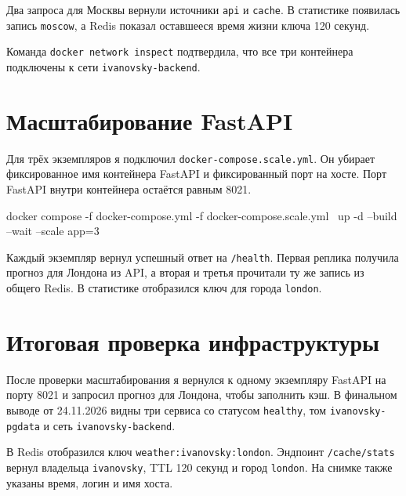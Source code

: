 Два запроса для Москвы вернули источники \texttt{api} и \texttt{cache}. В статистике появилась запись \texttt{moscow}, а Redis показал оставшееся время жизни ключа 120 секунд.


Команда \texttt{docker network inspect} подтвердила, что все три контейнера подключены к сети \texttt{ivanovsky-backend}.


\chapter{Масштабирование FastAPI}
Для трёх экземпляров я подключил \texttt{docker-compose.scale.yml}. Он убирает фиксированное имя контейнера FastAPI и фиксированный порт на хосте. Порт FastAPI внутри контейнера остаётся равным 8021.

\begin{code}
docker compose -f docker-compose.yml -f docker-compose.scale.yml \
  up -d --build --wait --scale app=3
\end{code}


Каждый экземпляр вернул успешный ответ на \texttt{/health}. Первая реплика получила прогноз для Лондона из API, а вторая и третья прочитали ту же запись из общего Redis. В статистике отобразился ключ для города \texttt{london}.


\chapter{Итоговая проверка инфраструктуры}
После проверки масштабирования я вернулся к одному экземпляру FastAPI на порту 8021 и запросил прогноз для Лондона, чтобы заполнить кэш. В финальном выводе от 24.11.2026 видны три сервиса со статусом \texttt{healthy}, том \texttt{ivanovsky-pgdata} и сеть \texttt{ivanovsky-backend}.

В Redis отобразился ключ \texttt{weather:ivanovsky:london}. Эндпоинт \texttt{/cache/stats} вернул владельца \texttt{ivanovsky}, TTL 120 секунд и город \texttt{london}. На снимке также указаны время, логин и имя хоста.

